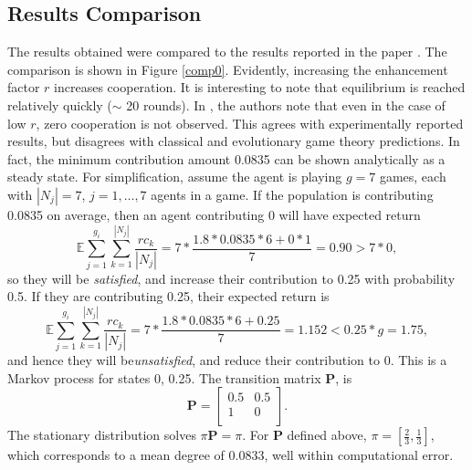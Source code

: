 \subsection{Results Comparison}
The results obtained were compared to the results reported in the paper \cite{RN49}. The comparison is shown in Figure \ref{comp0}. Evidently, increasing the enhancement factor $r$ increases cooperation. It is interesting to note that equilibrium is reached relatively quickly ($\sim$ 20 rounds). In \cite{RN49}, the authors note that even in the case of low $r$, zero cooperation is not observed. This agrees with experimentally reported results, but disagrees with classical and evolutionary game theory predictions. In fact, the minimum contribution amount 0.0835 can be shown analytically as a steady state. For simplification, assume the agent is playing $g=7$ games, each with $|N_j|=7$, $j=1, \dots, 7$ agents in a game. If the population is contributing 0.0835 on average, then  an agent contributing 0 will have expected return $$ \mathbb E \sum_{j=1}^{g_i} \sum_{k=1}^{|N_j|} \frac{rc_k}{|N_j|} =   7*\frac{1.8*0.0835*6 + 0*1}{7} =  0.90 >7*0,$$ so they will be \emph{satisfied}, and increase their contribution to 0.25 with probability 0.5. If they are contributing 0.25, their expected return is 
$$ \mathbb E \sum_{j=1}^{g_i} \sum_{k=1}^{|N_j|} \frac{rc_k}{|N_j|} =7* \frac{1.8*0.0835*6 + 0.25}{7} = 1.152< 0.25*g  =1.75, $$
 and hence they will be\emph{unsatisfied}, and reduce their contribution to 0. This is a Markov process for states 0, 0.25. The transition matrix $\mathbf{P}$, is $$\mathbf P = \begin{bmatrix} 0.5& 0.5 \\
1& 0 \\
\end{bmatrix}. $$ The stationary distribution solves $\pi \mathbf{P} = \pi$. For $\mathbf{P}$ defined above, $\pi = [\tfrac{2}{3}, \tfrac{1}{3}]$, which corresponds to a mean degree of 0.0833, well within computational error. 

